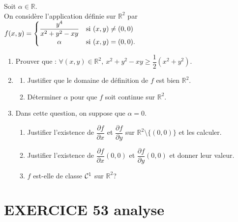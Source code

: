\documentclass[10pt,oneside]{article}
\begin{document}
\begin{flushleft}
Soit $\alpha\in\mathbb R$.\\ 
 On considère l'application définie sur $\mathbb{R}^2$ par  $f(x,y)=\begin{cases}
\dfrac{y^{4}}{x^{2}+y^{2}-xy} & \mathrm{si}\  (x,y)\not=(0,0)\\ 
\hfil\alpha & \mathrm{si}\  (x,y)=(0,0).
\end{cases} $
\begin{enumerate}
\item Prouver que : $\forall(x,y)\in\mathbb R^{2},\:x^{2}+y^{2}-xy\geqslant\dfrac{1}{2}(x^{2}+y^{2})$.

\item 

\begin{enumerate}
\item 
Justifier que le domaine de définition de $f$ est bien $\mathbb{R}^2$.

\item Déterminer $\alpha$ pour que $f$ soit continue sur $\mathbb R^{2}$.
\end{enumerate}
\item
Dans cette question, on suppose que $\alpha=0$.
\begin{enumerate}
\item
 Justifier l'existence de $\dfrac{\partial f}{\partial x}$ et $\dfrac{\partial f}{\partial y}$ sur $\mathbb R^{2}\setminus\big\{(0,0)\big\}$ et les calculer.

\item Justifier l'existence de $\dfrac{\partial f}{\partial x}(0,0)$ et $\dfrac{\partial f}{\partial y}(0,0)$ et  donner leur valeur.
\item $f$ est-elle de classe ${\cal C}^{1}$ sur $\mathbb R^{2}$? 

\end{enumerate}
\end{enumerate}

\section*{EXERCICE 53 \:analyse }


\end{flushleft}
\end{document}
